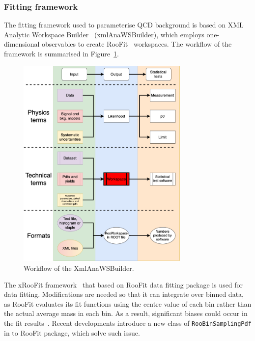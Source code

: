 \label{sec:statistical_framework}

\subsubsection{Fitting framework}

The fitting framework used to parameterise QCD background is based on XML Analytic Workspace Builder~\cite{xmlAnaWSBuilder} (xmlAnaWSBuilder), which employs one-dimensional 
observables to create RooFit~\cite{RooFit} workspaces. The workflow of the framework is summarised in Figure~\ref{fig:xmlAnaWSBuilderworkflow}.

\begin{figure}[htb]
 \centering
\includegraphics[width=0.75\textwidth]{fig/06-StatisticalFramework/xmlAnaWSBuilder_workflow}
\caption{Workflow of the XmlAnaWSBuilder.  \label{fig:xmlAnaWSBuilderworkflow}}
\end{figure}

The xRooFit framework~\cite{xRooFit} that based on RooFit data fitting package is used for data fitting. Modifications are needed so that it can integrate over binned data, as RooFit evaluates its fit functions using the centre value of each bin rather than the actual average mass in each bin. As a result, significant biases could occur in the fit results~\cite{gligorov2021avoiding}. Recent developments introduce a new class of \texttt{RooBinSamplingPdf} in to RooFit package, which solve such issue.

